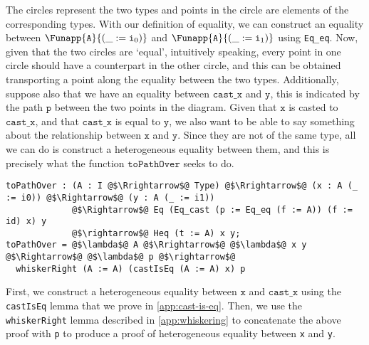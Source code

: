 \documentclass[12pt,twoside,maitrise]{dms}
\theoremstyle{definition}
\numberwithin{equation}{section}
\numberwithin{table}{chapter}
\numberwithin{figure}{chapter}
\newcommand\id[1] {\texttt{#1}}
\begin{document}
\begin{center}
\begin{tikzpicture}[x=0.75pt,y=0.75pt,yscale=-1,xscale=1]
\end{tikzpicture}

\end{center}

The circles represent the two types and points in the circle are elements of the
corresponding types. With our definition of equality, we can construct an
equality between $\Funapp{\id{A}}{(\earg{\_}{\ileft})}$ and
$\Funapp{\id{A}}{(\earg{\_}{\iright})}$ using \id{Eq\_eq}. Now, given that the
two circles are `equal', intuitively speaking, every point in one circle should
have a counterpart in the other circle, and this can be obtained transporting a
point along the equality between the two types. Additionally, suppose also that
we have an equality between $\id{cast\_x}$ and $\id{y}$, this is indicated
by the path $\id{p}$ between the two points in the diagram. Given that $\id{x}$
is casted to $\id{cast\_x}$, and that $\id{cast\_x}$ is equal to
$\id{y}$, we also want to be able to say something about the relationship
between $\id{x}$ and $\id{y}$. Since they are not of the same type, all we can
do is construct a heterogeneous equality between them, and this is precisely
what the function $\id{toPathOver}$ seeks to do.

\begin{verbatim}
toPathOver : (A : I @$\Rrightarrow$@ Type) @$\Rrightarrow$@ (x : A (_ := i0)) @$\Rightarrow$@ (y : A (_ := i1))
             @$\Rightarrow$@ Eq (Eq_cast (p := Eq_eq (f := A)) (f := id) x) y
             @$\rightarrow$@ Heq (t := A) x y;
toPathOver = @$\lambda$@ A @$\Rrightarrow$@ @$\lambda$@ x y @$\Rightarrow$@ @$\lambda$@ p @$\rightarrow$@
  whiskerRight (A := A) (castIsEq (A := A) x) p
\end{verbatim}

First, we construct a heterogeneous equality between $\id{x}$ and $\id{cast\_x}$
using the \id{castIsEq} lemma that we prove in \autoref{app:cast-is-eq}. Then,
we use the \id{whiskerRight} lemma described in \autoref{app:whiskering} to
concatenate the above proof with \id{p} to produce a proof of heterogeneous
equality between \id{x} and \id{y}.
\end{document}
